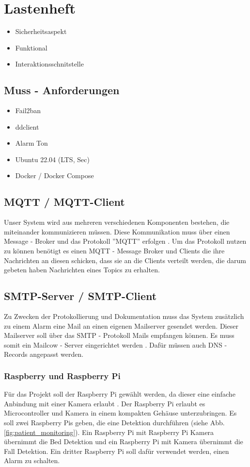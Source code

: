 
\section{Lastenheft}
\begin{itemize}
    \item Sicherheitsaspekt
    \item Funktional 
    \item Interaktionsschnitstelle
\end{itemize}

\subsection{Muss - Anforderungen}
\begin{itemize}
  \item  Fail2ban
  \item ddclient
  \item Alarm Ton
  \item Ubuntu 22.04 (LTS, Sec)
  \item Docker / Docker Compose
\end{itemize}

\subsection{MQTT / MQTT-Client}
Unser System wird aus mehreren verschiedenen Komponenten bestehen, die miteinander kommunizieren müssen. Diese Kommunikation muss über einen Message - Broker und das Protokoll ''MQTT'' erfolgen \cite{MQTT} . Um das Protokoll nutzen zu können benötigt es einen MQTT - Message Broker und Clients die ihre Nachrichten an diesen schicken, dass sie an die Clients verteilt werden, die darum gebeten haben Nachrichten eines Topics zu erhalten. 

\subsection{SMTP-Server / SMTP-Client}
Zu Zwecken der Protokollierung und Dokumentation muss das System zusätzlich zu einem Alarm eine Mail an einen eigenen Mailserver gesendet werden. Dieser Mailserver soll über das SMTP - Protokoll Mails empfangen können. Es muss somit ein Mailcow - Server eingerichtet werden  \cite{Mailcow} . Dafür müssen auch DNS - Records angepasst werden. 

\subsubsection{Raspberry und Raspberry Pi} \label{sec:raspi}
Für das Projekt soll der Raspberry Pi gewählt werden, da dieser eine einfache Anbindung mit einer Kamera erlaubt \cite{Raspberry}  \cite{Raspberry_camera}. Der Raspberry Pi erlaubt es Microcontroller und Kamera in einem kompakten Gehäuse unterzubringen.  Es soll zwei Raspberry Pis geben, die eine Detektion  durchführen (siehe Abb. \ref{fig:patient_monitoring}). Ein Raspberry Pi mit Raspberry Pi Kamera übernimmt die Bed Detektion und ein Raspberry Pi mit Kamera übernimmt die Fall Detektion. Ein dritter Raspberry Pi soll  dafür verwendet werden,  einen Alarm zu schalten. 

